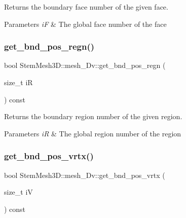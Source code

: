 Returns the boundary face number of the given face. 


\begin{DoxyParams}{Parameters}
{\em iF} & The global face number of the face \\
\hline
\end{DoxyParams}
\mbox{\label{classStemMesh3D_1_1mesh__3Dv_a39cd8935fe64cca4d649ded1bdb073ea}} 
\subsubsection{\texorpdfstring{get\+\_\+bnd\+\_\+pos\+\_\+regn()}{get\_bnd\_pos\_regn()}}
{\footnotesize\ttfamily bool Stem\+Mesh3\+D\+::mesh\+\_\+Dv\+::get\+\_\+bnd\+\_\+pos\+\_\+regn (\begin{DoxyParamCaption}\item[{size\+\_\+t}]{iR }\end{DoxyParamCaption}) const}



Returns the boundary region number of the given region. 


\begin{DoxyParams}{Parameters}
{\em iR} & The global region number of the region \\
\hline
\end{DoxyParams}
\mbox{\label{classStemMesh3D_1_1mesh__3Dv_ae52d0ac704be160984e7ef7bfde79758}} 
\subsubsection{\texorpdfstring{get\+\_\+bnd\+\_\+pos\+\_\+vrtx()}{get\_bnd\_pos\_vrtx()}}
{\footnotesize\ttfamily bool Stem\+Mesh3\+D\+::mesh\+\_\+Dv\+::get\+\_\+bnd\+\_\+pos\+\_\+vrtx (\begin{DoxyParamCaption}\item[{size\+\_\+t}]{iV }\end{DoxyParamCaption}) const}



